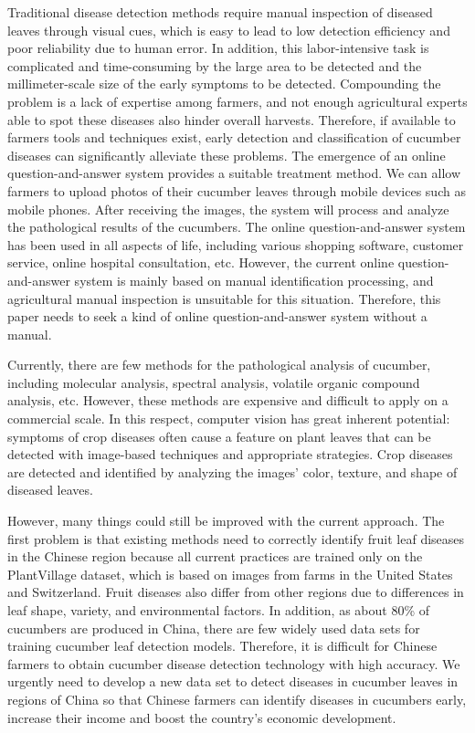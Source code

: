 \documentclass[a4paper,fleqn]{cas-sc}
\begin{document}
Traditional disease detection methods require manual inspection of diseased leaves through visual cues, which is easy to lead to low detection efficiency and poor reliability due to human error. In addition, this labor-intensive task is complicated and time-consuming by the large area to be detected and the millimeter-scale size of the early symptoms to be detected. Compounding the problem is a lack of expertise among farmers, and not enough agricultural experts able to spot these diseases also hinder overall harvests. Therefore, if available to farmers tools and techniques exist, early detection and classification of cucumber diseases can significantly alleviate these problems. 
The emergence of an online question-and-answer system provides a suitable treatment method. We can allow farmers to upload photos of their cucumber leaves through mobile devices such as mobile phones. After receiving the images, the system will process and analyze the pathological results of the cucumbers. The online question-and-answer system has been used in all aspects of life, including various shopping software, customer service, online hospital consultation, etc. However, the current online question-and-answer system is mainly based on manual identification processing, and agricultural manual inspection is unsuitable for this situation. Therefore, this paper needs to seek a kind of online question-and-answer system without a manual. 

Currently, there are few methods for the pathological analysis of cucumber, including molecular analysis, spectral analysis, volatile organic compound analysis, etc. However, these methods are expensive and difficult to apply on a commercial scale. \cite{martinelli2015advanced} In this respect, computer vision has great inherent potential: symptoms of crop diseases often cause a feature on plant leaves that can be detected with image-based techniques and appropriate strategies. Crop diseases are detected and identified by analyzing the images' color, texture, and shape of diseased leaves. \cite{benfenati2021unsupervised}

However, many things could still be improved with the current approach. The first problem is that existing methods need to correctly identify fruit leaf diseases in the Chinese region because all current practices are trained only on the PlantVillage dataset, which is based on images from farms in the United States and Switzerland. Fruit diseases also differ from other regions due to differences in leaf shape, variety, and environmental factors. In addition, as about 80\% of cucumbers are produced in China, there are few widely used data sets for training cucumber leaf detection models. Therefore, it is difficult for Chinese farmers to obtain cucumber disease detection technology with high accuracy. We urgently need to develop a new data set to detect diseases in cucumber leaves in regions of China so that Chinese farmers can identify diseases in cucumbers early, increase their income and boost the country's economic development.
\end{document}
